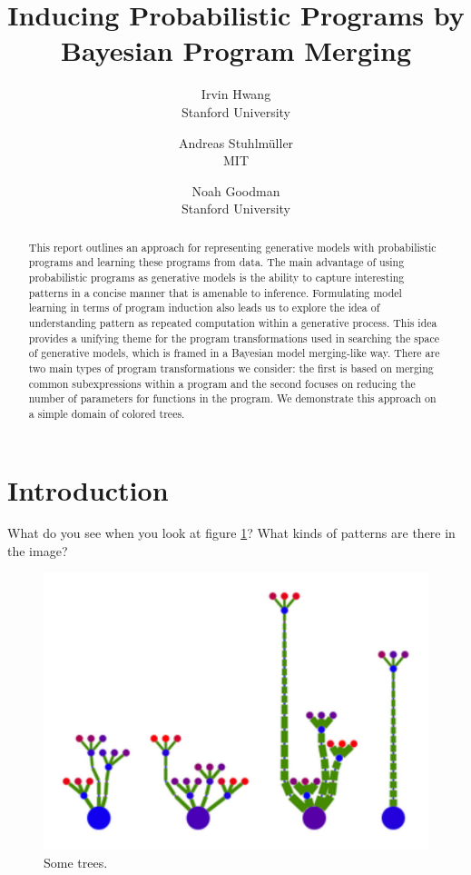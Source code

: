 \documentclass[a4paper,10pt]{article}
\begin{document}
\title{Inducing Probabilistic Programs by Bayesian Program Merging}
\author{Irvin Hwang\\Stanford University  \and Andreas Stuhlm\"{u}ller\\MIT \and Noah Goodman\\Stanford University}
\date{}
\maketitle
\begin{abstract}
This report outlines an approach for representing generative models with probabilistic programs and learning these programs from data.  The main advantage of using probabilistic programs as generative models is the ability to capture interesting patterns in a concise manner that is amenable to inference.  Formulating model learning in terms of program induction also leads us to explore the idea of understanding pattern as repeated computation within a generative process.  This idea provides a unifying theme for the program transformations used in searching the space of generative models, which is framed in a Bayesian model merging-like way.  There are two main types of program transformations we consider: the first is based on merging common subexpressions within a program and the second focuses on reducing the number of parameters for functions in the program.  We demonstrate this approach on a simple domain of colored trees.
\end{abstract}
\section{Introduction}
What do you see when you look at figure \ref{fig:plants}? What kinds of patterns are there in the image? 
\begin{figure}[h]
\begin{center}
\includegraphics[scale=.60]{trees.pdf}
\end{center}
\caption{Some trees.}
\label{fig:plants}
\end{figure}
\end{document}
